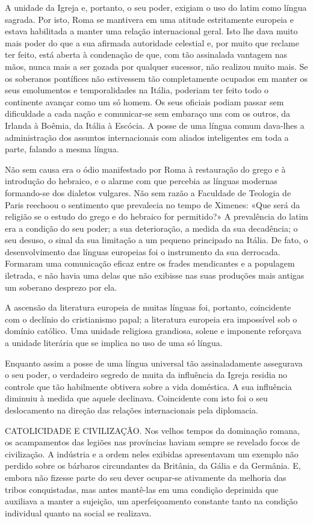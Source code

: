 \documentclass[11pt,a5paper,twoside,openany]{book}
\begin{document}
A unidade da Igreja e, portanto, o seu poder, exigiam o uso do latim como língua sagrada. Por isto, Roma se mantivera em uma atitude estritamente europeia e estava habilitada a manter uma relação internacional geral. Isto lhe dava muito mais poder do que a sua afirmada autoridade celestial e, por muito que reclame ter feito, está aberta à condenação de que, com tão assinalada vantagem nas mãos, nunca mais a ser gozada por qualquer sucessor, não realizou muito mais. Se os soberanos pontífices não estivessem tão completamente ocupados em manter os seus emolumentos e temporalidades na Itália, poderiam ter feito todo o continente avançar como um só homem. Os seus oficiais podiam passar sem dificuldade a cada nação e comunicar-se sem embaraço uns com os outros, da Irlanda à Boêmia, da Itália à Escócia. A posse de uma língua comum dava-lhes a administração dos assuntos internacionais com aliados inteligentes em toda a parte, falando a mesma língua.

Não sem causa era o ódio manifestado por Roma à restauração do grego e à introdução do hebraico, e o alarme com que percebia as línguas modernas formando-se dos dialetos vulgares. Não sem razão a Faculdade de Teologia de Paris reechoou o sentimento que prevalecia no tempo de Ximenes: «Que será da religião se o estudo do grego e do hebraico for permitido?» A prevalência do latim era a condição do seu poder; a sua deterioração, a medida da sua decadência; o seu desuso, o sinal da sua limitação a um pequeno principado na Itália. De fato, o desenvolvimento das línguas europeias foi o instrumento da sua derrocada. Formaram uma comunicação eficaz entre os frades mendicantes e a populagem iletrada, e não havia uma delas que não exibisse nas suas produções mais antigas um soberano desprezo por ela.

A ascensão da literatura europeia de muitas línguas foi, portanto, coincidente com o declínio do cristianismo papal; a literatura europeia era impossível sob o domínio católico. Uma unidade religiosa grandiosa, solene e imponente reforçava a unidade literária que se implica no uso de uma só língua.

Enquanto assim a posse de uma língua universal tão assinaladamente assegurava o seu poder, o verdadeiro segredo de muita da influência da Igreja residia no controle que tão habilmente obtivera sobre a vida doméstica. A sua influência diminuiu à medida que aquele declinava. Coincidente com isto foi o seu deslocamento na direção das relações internacionais pela diplomacia.

CATOLICIDADE E CIVILIZAÇÃO. Nos velhos tempos da dominação romana, os acampamentos das legiões nas províncias haviam sempre se revelado focos de civilização. A indústria e a ordem neles exibidas apresentavam um exemplo não perdido sobre os bárbaros circundantes da Britânia, da Gália e da Germânia. E, embora não fizesse parte do seu dever ocupar-se ativamente da melhoria das tribos conquistadas, mas antes mantê-las em uma condição deprimida que auxiliava a manter a sujeição, um aperfeiçoamento constante tanto na condição individual quanto na social se realizava.
\end{document}
